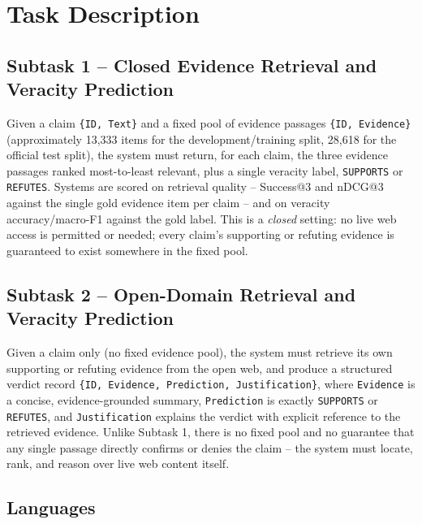\documentclass[
]{ceurart}
\begin{document}
\section{Task Description}

\subsection{Subtask 1 -- Closed Evidence Retrieval and Veracity Prediction}

Given a claim \texttt{\{ID, Text\}} and a fixed pool of evidence
passages \texttt{\{ID, Evidence\}} (approximately 13{,}333 items for the
development/training split, 28{,}618 for the official test split), the
system must return, for each claim, the three evidence passages ranked
most-to-least relevant, plus a single veracity label, \texttt{SUPPORTS}
or \texttt{REFUTES}. Systems are scored on retrieval quality --
Success@3 and nDCG@3 against the single gold evidence item per claim --
and on veracity accuracy/macro-F1 against the gold label. This is a
\emph{closed} setting: no live web access is permitted or needed; every
claim's supporting or refuting evidence is guaranteed to exist somewhere
in the fixed pool.

\subsection{Subtask 2 -- Open-Domain Retrieval and Veracity Prediction}

Given a claim only (no fixed evidence pool), the system must retrieve
its own supporting or refuting evidence from the open web, and produce
a structured verdict record \texttt{\{ID, Evidence, Prediction,
Justification\}}, where \texttt{Evidence} is a concise,
evidence-grounded summary, \texttt{Prediction} is exactly
\texttt{SUPPORTS} or \texttt{REFUTES}, and \texttt{Justification}
explains the verdict with explicit reference to the retrieved evidence.
Unlike Subtask 1, there is no fixed pool and no guarantee that any
single passage directly confirms or denies the claim -- the system must
locate, rank, and reason over live web content itself.

\subsection{Languages}
\end{document}
